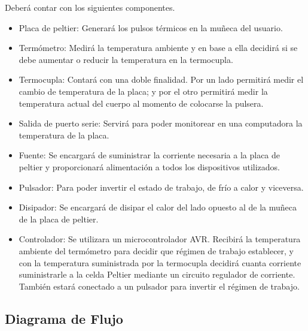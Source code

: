 \documentclass[10pt,spanish,a4paper,openany,notitlepage]{article}
\begin{document}
Deberá contar con los siguientes componentes.

\begin{itemize}
\item{Placa de peltier:} Generará los pulsos térmicos en la muñeca del usuario.
\item{Termómetro:} Medirá la temperatura ambiente y en base a ella decidirá 
si se debe aumentar o reducir la temperatura en la termocupla.
\item{Termocupla:} Contará con una doble finalidad. Por un lado permitirá 
medir el cambio de temperatura de la placa; y por el otro permitirá medir 
la temperatura actual del cuerpo al momento de colocarse la pulsera.
\item{Salida de puerto serie:} Servirá para poder monitorear en una 
computadora la temperatura de la placa.
\item{Fuente:} Se encargará de suministrar la corriente necesaria a la 
placa de peltier y proporcionará alimentación a todos los dispositivos utilizados.
\item{Pulsador:} Para poder invertir el estado de trabajo, de frío a calor 
y viceversa.
\item{Disipador:} Se encargará de disipar el calor del lado opuesto al de 
la muñeca de la placa de peltier.
\item{Controlador:} Se utilizara un microcontrolador AVR. Recibirá la temperatura ambiente del termómetro
para decidir que régimen de trabajo establecer, y con la temperatura suministrada por la termocupla
decidirá cuanta corriente suministrarle a la celda Peltier mediante un circuito regulador de corriente.
También estará conectado a un pulsador para invertir el régimen de trabajo.
\end{itemize}

\subsection{Diagrama de Flujo}
\end{document}
